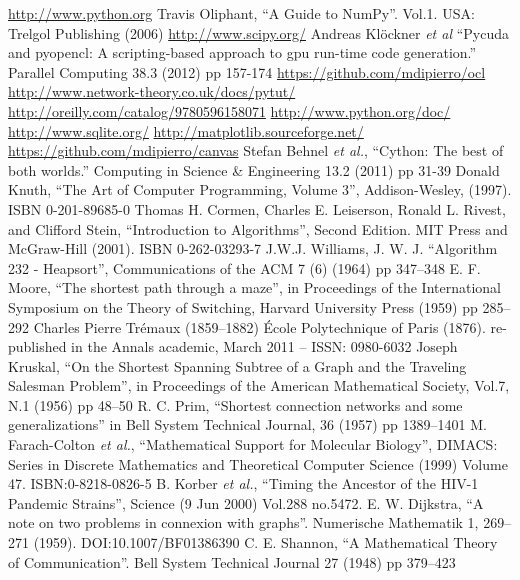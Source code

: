 \documentclass[justified,sixbynine]{tufte-book}
\theoremstyle{plain}%
\theoremstyle{definition}
\theoremstyle{remark}
\begin{document}
\begin{thebibliography}{999}
 \url{http://www.python.org}
 Travis Oliphant, ``A Guide to NumPy''. Vol.1. USA: Trelgol Publishing (2006)
 \url{http://www.scipy.org/}
 Andreas Klöckner {\it et al} ``Pycuda and pyopencl: A scripting-based approach to gpu run-time code generation.'' Parallel Computing 38.3 (2012) pp 157-174
 \url{https://github.com/mdipierro/ocl}
 \url{http://www.network-theory.co.uk/docs/pytut/}
 \url{http://oreilly.com/catalog/9780596158071}
 \url{http://www.python.org/doc/}
 \url{http://www.sqlite.org/}
 \url{http://matplotlib.sourceforge.net/}
 \url{https://github.com/mdipierro/canvas}
 Stefan Behnel {\it et al.}, ``Cython: The best of both worlds.'' Computing in Science \& Engineering 13.2 (2011) pp 31-39
 Donald Knuth, ``The Art of Computer Programming, Volume 3'', Addison-Wesley, (1997). ISBN 0-201-89685-0
 Thomas H. Cormen, Charles E. Leiserson, Ronald L. Rivest, and Clifford Stein, ``Introduction to Algorithms'', Second Edition. MIT Press and McGraw-Hill (2001). ISBN 0-262-03293-7
 J.W.J. Williams, J. W. J. ``Algorithm 232 - Heapsort'', Communications of the ACM 7 (6) (1964) pp 347–348
 E. F. Moore, ``The shortest path through a maze'', in Proceedings of the International Symposium on the Theory of Switching, Harvard University Press (1959) pp 285–292
 Charles Pierre Trémaux (1859–1882) École Polytechnique of Paris (1876). re-published in the Annals academic, March 2011 – ISSN: 0980-6032
 Joseph Kruskal, ``On the Shortest Spanning Subtree of a Graph and the Traveling Salesman Problem'', in Proceedings of the American Mathematical Society, Vol.7, N.1 (1956) pp 48–50
 R. C. Prim, ``Shortest connection networks and some generalizations'' in Bell System Technical Journal, 36 (1957) pp 1389–1401
 M. Farach-Colton {\it et al.}, ``Mathematical Support for Molecular Biology'', DIMACS: Series in Discrete Mathematics and Theoretical Computer Science (1999) Volume 47. ISBN:0-8218-0826-5
 B. Korber {\it et al.}, ``Timing the Ancestor of the HIV-1 Pandemic Strains'', Science (9 Jun 2000) Vol.288 no.5472.
 E. W. Dijkstra, ``A note on two problems in connexion with graphs''. Numerische Mathematik 1, 269–271 (1959). DOI:10.1007/BF01386390
 C. E. Shannon, ``A Mathematical Theory of Communication''. Bell System Technical Journal 27 (1948) pp 379–423

\end{thebibliography}
\end{document}
